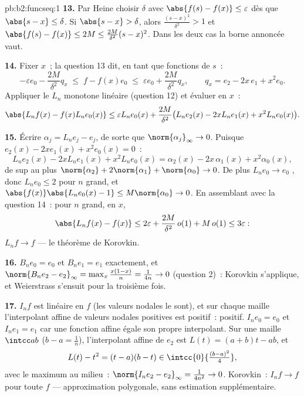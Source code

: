 \begin{solution}{pb:b2:funcseq:1}
\textbf{13.} Par Heine choisir $\delta$ avec $\abs{f(s)-f(x)}
\leq \varepsilon$ dès que $\abs{s-x} \leq \delta$. Si
$\abs{s - x} > \delta$, alors $\frac{(s-x)^2}{\delta^2} > 1$ et
$\abs{f(s)-f(x)} \leq 2M \leq \frac{2M}{\delta^2}(s-x)^2$. Dans
les deux cas la borne annoncée vaut.

\textbf{14.} Fixer $x$~; la question 13 dit, en tant que fonctions de
$s$~:
\[
-\varepsilon e_0 - \frac{2M}{\delta^2}q_x
\;\leq\; f - f(x)e_0
\;\leq\; \varepsilon e_0 + \frac{2M}{\delta^2}q_x,
\qquad q_x = e_2 - 2x\,e_1 + x^2e_0 .
\]
Appliquer le $L_n$ monotone linéaire (question 12) et évaluer en
$x$~:
\[
\abs{L_nf(x) - f(x)L_ne_0(x)}
\leq \varepsilon L_ne_0(x)
+ \frac{2M}{\delta^2}\bigl(L_ne_2(x) - 2xL_ne_1(x)
+ x^2L_ne_0(x)\bigr) .
\]

\textbf{15.} Écrire $\alpha_j = L_ne_j - e_j$, de sorte que
$\norm{\alpha_j}_\infty \to 0$. Puisque $e_2(x) - 2xe_1(x) +
x^2e_0(x) = 0$~:
\[
L_ne_2(x) - 2xL_ne_1(x) + x^2L_ne_0(x)
= \alpha_2(x) - 2x\,\alpha_1(x) + x^2\alpha_0(x),
\]
de  sup au plus $\norm{\alpha_2} + 2\norm{\alpha_1} +
\norm{\alpha_0} \to 0$. De plus $L_ne_0 \to e_0$ , donc
$L_ne_0 \leq 2$ pour $n$ grand, et $\abs{f(x)}\abs{L_ne_0(x) -
1} \leq M\norm{\alpha_0} \to 0$. En assemblant avec la question 14~:
pour $n$ grand,  en $x$,
\[
\abs{L_nf(x) - f(x)} \leq 2\varepsilon +
\frac{2M}{\delta^2}\,o(1) + M\,o(1) \leq 3\varepsilon :
\]
$L_nf \to f$  --- le théorème de Korovkin.

\textbf{16.} $B_ne_0 = e_0$ et $B_ne_1 = e_1$ exactement, et
$\norm{B_ne_2 - e_2}_\infty = \max_x\frac{x(1-x)}{n} =
\frac{1}{4n} \to 0$ (question 2)~: Korovkin s'applique, et
Weierstrass s'ensuit pour la troisième fois.

\textbf{17.} $I_nf$ est linéaire en $f$ (les valeurs nodales le sont),
et sur chaque maille l'interpolant affine de valeurs nodales positives
est positif~: positif. $I_ne_0 = e_0$ et $I_ne_1 = e_1$
car une fonction affine égale son propre interpolant. Sur une
maille $\intcc ab$ ($b - a = \frac1n$), l'interpolant affine de
$e_2$ est $L(t) = (a+b)t - ab$, et
\[
L(t) - t^2 = (t-a)(b-t) \in
\intcc{0}{\tfrac{(b-a)^2}{4}} ,
\]
avec le maximum au milieu~: $\norm{I_ne_2 - e_2}_\infty =
\frac{1}{4n^2} \to 0$. Korovkin~: $I_nf \to f$  pour
toute $f$  --- approximation polygonale, sans
estimation supplémentaire.


\end{solution}

